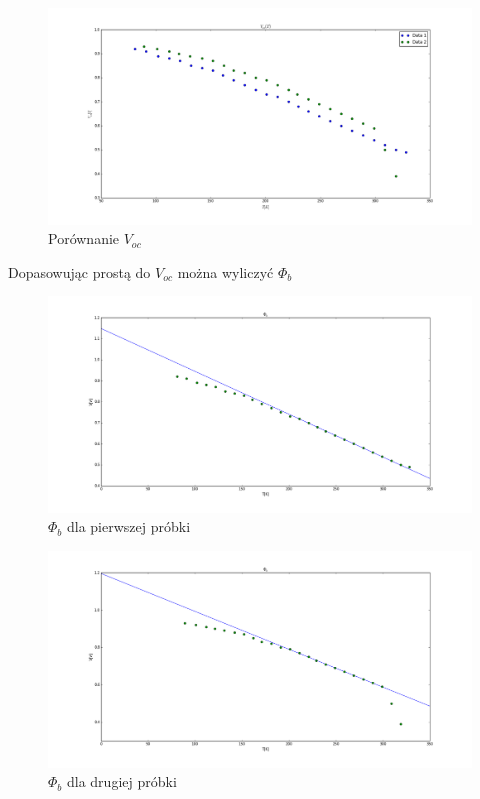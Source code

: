 \documentclass[a4paper,12pt]{article}
\begin{document}
\begin{figure} [H]
  \begin{center}
    \includegraphics[width = 15cm]{probki_porownanie_V_oc.png}
    \caption{Porównanie $V_{oc}$}
  \end{center}
\end{figure}


Dopasowując prostą do $V_{oc}$ można wyliczyć  $\Phi_b$
\begin{figure} [H]
  \begin{center}
    \includegraphics[width = 15cm]{probka1_phi_b.png}
    \caption{$\Phi_b$ dla pierwszej próbki}
  \end{center}
\end{figure}

\begin{figure} [H]
  \begin{center}
    \includegraphics[width = 15cm]{probka2_phi_b.png}
    \caption{$\Phi_b$ dla drugiej próbki}
  \end{center}
\end{figure}
\end{document}
